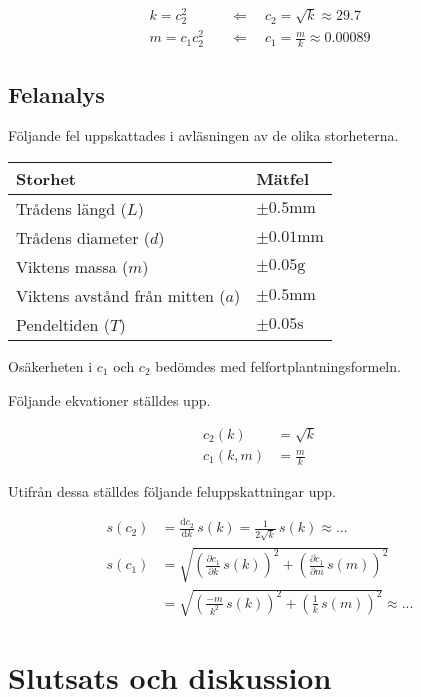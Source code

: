\documentclass[a4paper,12pt]{article}
\newcommand*{\dd}{\mathrm{d}}
\begin{document}
\begin{align}
  k = c_2^2 \quad &\Leftarrow \quad c_2 = \sqrt{k} \approx 29.7\\
  m = c_1c_2^2 \quad &\Leftarrow \quad c_1 = \frac{m}{k} \approx 0.00089
\end{align}

\subsection{Felanalys}

Följande fel uppskattades i avläsningen av de olika storheterna.

\begin{tabular}{|l|l|}
  \hline
  \textbf{Storhet} & \textbf{Mätfel} \\\hline
  Trådens längd ($L$) & $\pm 0.5 \text{mm}$ \\\hline
  Trådens diameter ($d$) & $\pm 0.01 \text{mm}$ \\\hline
  Viktens massa ($m$) & $\pm 0.05 \text{g}$ \\\hline
  Viktens avstånd från mitten ($a$) & $\pm 0.5 \text{mm}$ \\\hline
  Pendeltiden ($T$) & $\pm 0.05 \text{s}$ \\\hline
\end{tabular}

Osäkerheten i $c_1$ och $c_2$ bedömdes med felfortplantningsformeln.

Följande ekvationer ställdes upp.

\begin{align}
  c_2(k) &= \sqrt{k} \\
  c_1(k, m) &= \frac{m}{k}
\end{align} 

Utifrån dessa ställdes följande feluppskattningar upp.

\begin{align}
  s(c_2) &= \frac{\dd c_2}{\dd k} \, s(k) = \frac{1}{2\sqrt{k}} \, s(k) \approx \num{...} \\
  s(c_1) &= \sqrt{\left( \frac{\partial c_1}{\partial k} \, s(k) \right)^2 + \left( \frac{\partial c_1}{\partial m} \, s(m) \right)^2} \nonumber \\
         &= \sqrt{\left( \frac{-m}{k^2} \, s(k) \right)^2 + \left( \frac{1}{k} \, s(m) \right)^2} \approx \num{...}
\end{align}

\clearpage

\section{Slutsats och diskussion}
\end{document}
